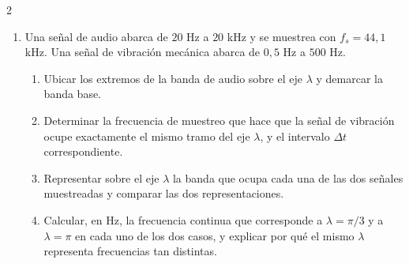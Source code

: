 \documentclass[10pt,a4paper]{article}
\begin{document}
\begin{multicols}{2}
\begin{enumerate}
		\textbf{El eje de frecuencias medido en $\lambda$}

		\item Una señal de audio abarca de $20$ Hz a $20$ kHz y se muestrea
		con $f_s = 44{,}1$ kHz. Una señal de vibración mecánica abarca de
		$0{,}5$ Hz a $500$ Hz.
		\begin{enumerate}
			\item Ubicar los extremos de la banda de audio sobre el eje
			$\lambda$ y demarcar la banda base.
			\item Determinar la frecuencia de muestreo que hace que la señal
			de vibración ocupe exactamente el mismo tramo del eje $\lambda$,
			y el intervalo $\Delta t$ correspondiente.
			\item Representar sobre el eje $\lambda$ la banda que ocupa cada
			una de las dos señales muestreadas y comparar las dos
			representaciones.
			\item Calcular, en Hz, la frecuencia continua que corresponde a
			$\lambda = \pi/3$ y a $\lambda = \pi$ en cada uno de los dos
			casos, y explicar por qué el mismo $\lambda$ representa
			frecuencias tan distintas.
		\end{enumerate}

		\end{enumerate}

	\end{multicols}
\end{document}

